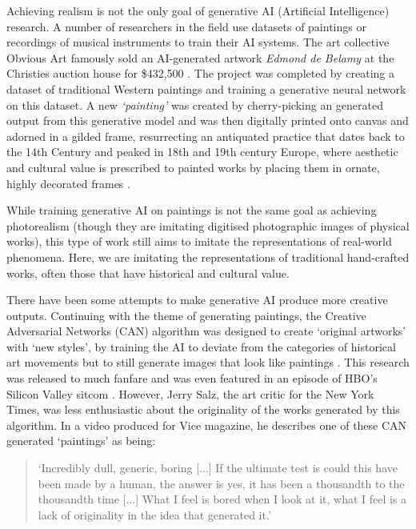 Achieving realism is not the only goal of generative AI (Artificial Intelligence) research. 
A number of researchers in the field use datasets of paintings or recordings of musical instruments to train their AI systems. 
The art collective Obvious Art famously sold an AI-generated artwork \textit{Edmond de Belamy} at the Christies auction house for \$432,500 \citep{christies2018edmond}.
The project was completed by creating a dataset of traditional Western paintings and training a generative neural network on this dataset. 
A new \textit{`painting’} was created by cherry-picking an generated output from this generative model and was then digitally printed onto canvas and adorned in a gilded frame, resurrecting an antiquated practice that dates back to the 14th Century and peaked in 18th and 19th century Europe, where aesthetic and cultural value is prescribed to painted works by placing them in ornate, highly decorated frames \citep{kiilerich2001savedoff}.

While training generative AI on paintings is not the same goal as achieving photorealism (though they are imitating digitised photographic images of physical works), this type of work still aims to imitate the representations of real-world phenomena. Here, we are imitating the representations of traditional hand-crafted works, often those that have historical and cultural value.

There have been some attempts to make generative AI produce more creative outputs. 
Continuing with the theme of generating paintings, the Creative Adversarial Networks (CAN) algorithm was designed to create ‘original artworks’ with ‘new styles’, by training the AI to deviate from the categories of historical art movements but to still generate images that look like paintings \cite{elgammal2017can}. 
This research was released to much fanfare and was even featured in an episode of HBO’s Silicon Valley sitcom \citep{elhoseiny2019hbo}. 
However, Jerry Salz, the art critic for the New York Times, was less enthusiastic about the originality of the works generated by this algorithm. 
In a video produced for Vice magazine, he describes one of these CAN generated `paintings' as being:

\begin{quote}
`Incredibly dull, generic, boring [...] If the ultimate test is could this have been made by a human, the answer is yes, it has been a thousandth to the thousandth time [...] What I feel is bored when I look at it, what I feel is a lack of originality in the idea that generated it.' \citep{saltz2018aiart}
\end{quote}

